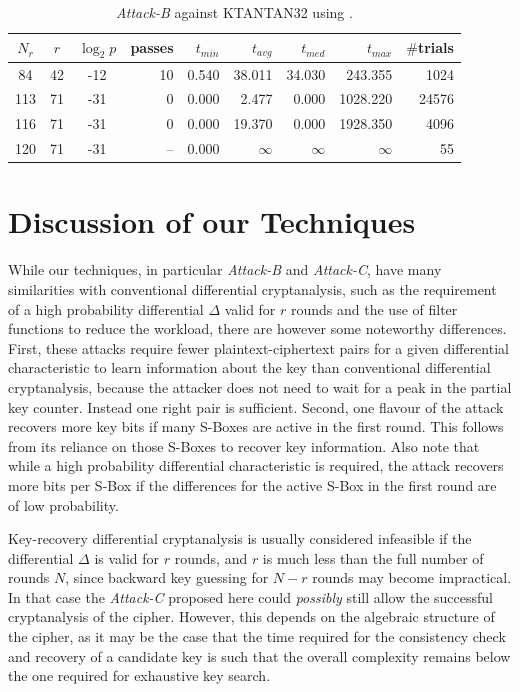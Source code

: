 \begin{table}[ht]
\begin{center}
\begin{tabular}{|c|c|c|r|r|r|r|r|r|}
\hline
 $N_r$ & $r$ & $\log_2 p$ & passes & $t_{min}$ & $t_{avg}$ & $t_{med}$ & $t_{max}$ & $\#$trials\\
\hline
 84 & 42 & -12 & 10 & 0.540 & 38.011 & 34.030 & 243.355 & 1024\\
113 & 71 & -31 &  0 & 0.000 &  2.477 & 0.000 & 1028.220 & 24576\\
116 & 71 & -31 &  0 & 0.000 & 19.370 & 0.000 &  1928.350 & 4096\\ %
120 & 71 & -31 & -- & 0.000 & $\infty$ & $\infty$ & $\infty$ & 55\\
\hline
\end{tabular}
\end{center}
\caption{\emph{Attack-B} against KTANTAN32 using \MiniSat.}
\label{tab:ktantan32-b-minisat2}
\end{table}



\section{Discussion of our Techniques}
\label{sec:discussion}
While our techniques, in particular \emph{Attack-B} and \emph{Attack-C}, have many similarities with conventional differential cryptanalysis, such as the requirement of a high probability differential $\Delta$ valid for $r$ rounds and the use of filter functions to reduce the workload, there are however some noteworthy differences. First, these attacks require fewer plaintext-ciphertext pairs for a given differential characteristic to learn information about the key than conventional differential cryptanalysis, because the attacker does not need to wait for a peak in the partial key counter. Instead one right pair is sufficient. Second, one flavour of the attack recovers more key bits if many S-Boxes are active in the first round. This follows from its reliance on those S-Boxes to recover key information. Also note that while a high probability differential characteristic is required, the attack recovers more bits per S-Box if the differences for the active S-Box in the first round are of low probability. 

Key-recovery differential cryptanalysis is usually considered infeasible if the differential $\Delta$ is valid for $r$ rounds, and $r$ is much less than the full number of rounds $N$, since backward key guessing for $N-r$ rounds may become impractical. In that case the \emph{Attack-C} proposed here could \emph{possibly} still allow the successful cryptanalysis of the cipher. However, this depends on the algebraic structure of the cipher, as it may be the case that the time required for the consistency check and recovery of a candidate key is such that the overall complexity remains below the one required for exhaustive key search.

